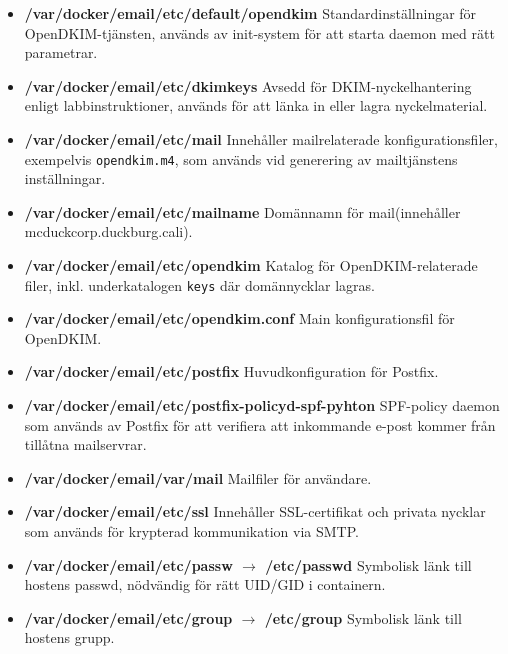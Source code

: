 \documentclass{report}
\begin{document}
\begin{itemize}
    \item \textbf{/var/docker/email/etc/default/opendkim} \newline
    Standardinställningar för OpenDKIM-tjänsten, används av init-system för att starta daemon med rätt parametrar.
    \item \textbf{/var/docker/email/etc/dkimkeys} \newline
    Avsedd för DKIM-nyckelhantering enligt labbinstruktioner, används för att länka in eller lagra nyckelmaterial.
    \item \textbf{/var/docker/email/etc/mail} \newline
    Innehåller mailrelaterade konfigurationsfiler, exempelvis \texttt{opendkim.m4}, som används vid generering av mailtjänstens inställningar.
    \item \textbf{/var/docker/email/etc/mailname} \newline
    Domännamn för mail(innehåller mcduckcorp.duckburg.cali).
    \item \textbf{/var/docker/email/etc/opendkim} \newline
    Katalog för OpenDKIM-relaterade filer, inkl. underkatalogen \texttt{keys} där domännycklar lagras.
    \item \textbf{/var/docker/email/etc/opendkim.conf} \newline
    Main konfigurationsfil för OpenDKIM.
    \item \textbf{/var/docker/email/etc/postfix} \newline
    Huvudkonfiguration för Postfix.
    \item \textbf{/var/docker/email/etc/postfix-policyd-spf-pyhton} \newline
    SPF-policy daemon som används av Postfix för att verifiera att inkommande e-post kommer från tillåtna mailservrar.
    \item \textbf{/var/docker/email/var/mail} \newline
    Mailfiler för användare.
    \item \textbf{/var/docker/email/etc/ssl} \newline
    Innehåller SSL-certifikat och privata nycklar som används för krypterad kommunikation via SMTP.
    \item \textbf{/var/docker/email/etc/passw $\rightarrow$ /etc/passwd} \newline
    Symbolisk länk till hostens passwd, nödvändig för rätt UID/GID i containern.
    \item \textbf{/var/docker/email/etc/group $\rightarrow$ /etc/group} \newline
    Symbolisk länk till hostens grupp.
\end{itemize}
\newpage
\end{document}
